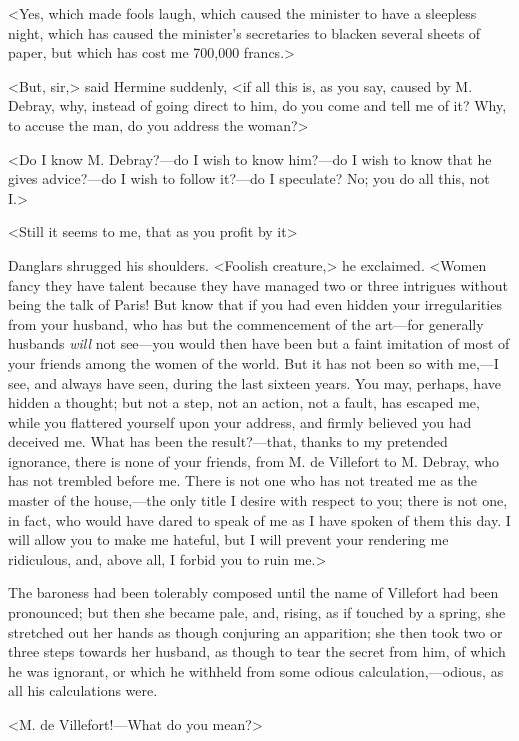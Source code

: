  <Yes, which made fools laugh, which caused the minister to have a sleepless night, which has caused the minister's secretaries to blacken several sheets of paper, but which has cost me 700,000 francs.> 

 <But, sir,> said Hermine suddenly, <if all this is, as you say, caused by M. Debray, why, instead of going direct to him, do you come and tell me of it? Why, to accuse the man, do you address the woman?> 

 <Do I know M. Debray?—do I wish to know him?—do I wish to know that he gives advice?—do I wish to follow it?—do I speculate? No; you do all this, not I.> 

 <Still it seems to me, that as you profit by it\longdash> 

 Danglars shrugged his shoulders. <Foolish creature,> he exclaimed. <Women fancy they have talent because they have managed two or three intrigues without being the talk of Paris! But know that if you had even hidden your irregularities from your husband, who has but the commencement of the art—for generally husbands \textit{will} not see—you would then have been but a faint imitation of most of your friends among the women of the world. But it has not been so with me,—I see, and always have seen, during the last sixteen years. You may, perhaps, have hidden a thought; but not a step, not an action, not a fault, has escaped me, while you flattered yourself upon your address, and firmly believed you had deceived me. What has been the result?—that, thanks to my pretended ignorance, there is none of your friends, from M. de Villefort to M. Debray, who has not trembled before me. There is not one who has not treated me as the master of the house,—the only title I desire with respect to you; there is not one, in fact, who would have dared to speak of me as I have spoken of them this day. I will allow you to make me hateful, but I will prevent your rendering me ridiculous, and, above all, I forbid you to ruin me.> 

 The baroness had been tolerably composed until the name of Villefort had been pronounced; but then she became pale, and, rising, as if touched by a spring, she stretched out her hands as though conjuring an apparition; she then took two or three steps towards her husband, as though to tear the secret from him, of which he was ignorant, or which he withheld from some odious calculation,—odious, as all his calculations were. 

 <M. de Villefort!—What do you mean?> 

